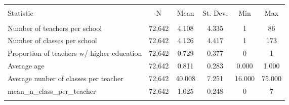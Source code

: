 
\begin{table}[!htbp] \centering 
  \caption{} 
  \label{} 
\begin{tabular}{@{\extracolsep{5pt}}lccccc} 
\\[-1.8ex]\hline 
\hline \\[-1.8ex] 
Statistic & \multicolumn{1}{c}{N} & \multicolumn{1}{c}{Mean} & \multicolumn{1}{c}{St. Dev.} & \multicolumn{1}{c}{Min} & \multicolumn{1}{c}{Max} \\ 
\hline \\[-1.8ex] 
Number of teachers per school & 72,642 & 4.108 & 4.335 & 1 & 86 \\ 
Number of classes per school & 72,642 & 4.126 & 4.417 & 1 & 173 \\ 
Proportion of teachers w/ higher education & 72,642 & 0.729 & 0.377 & 0 & 1 \\ 
Average age & 72,642 & 0.811 & 0.283 & 0.000 & 1.000 \\ 
Average nunber of classes per teacher & 72,642 & 40.008 & 7.251 & 16.000 & 75.000 \\ 
mean\_n\_class\_per\_teacher & 72,642 & 1.025 & 0.248 & 0 & 7 \\ 
\hline \\[-1.8ex] 
\end{tabular} 
\end{table} 
